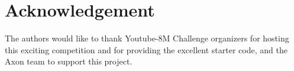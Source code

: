 \documentclass[runningheads]{llncs}
\begin{document}
\section{Acknowledgement}
The authors would like to thank Youtube-8M Challenge organizers for hosting this exciting competition and for providing the excellent starter code, and the Axon team to support this project.


\clearpage


\end{document}
